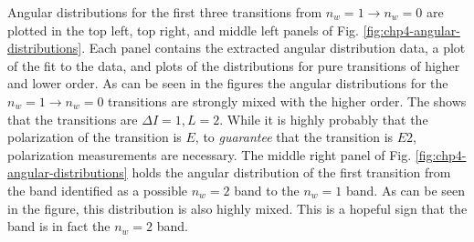 Angular distributions for the first three transitions from $n_w=1\rightarrow{}n_w=0$ are plotted in the top left, top right, and middle left panels of Fig. \ref{fig:chp4-angular-distributions}. Each panel contains the extracted angular distribution data, a plot of the fit to the data, and plots of the distributions for pure transitions of higher and lower order. As can be seen in the figures the angular distributions for the $n_w=1\rightarrow{}n_w=0$ transitions are strongly mixed with the higher order. The shows that the transitions are $\Delta{}I=1, L=2$. While it is highly probably that the polarization of the transition is $E$, to \emph{guarantee} that the transition is $E2$, polarization measurements are necessary. The middle right panel of Fig. \ref{fig:chp4-angular-distributions} holds the angular distribution of the first transition from the band identified as a possible $n_w=2$ band to the $n_w=1$ band. As can be seen in the figure, this distribution is also highly mixed. This is a hopeful sign that the band is in fact the $n_w=2$ band. 

